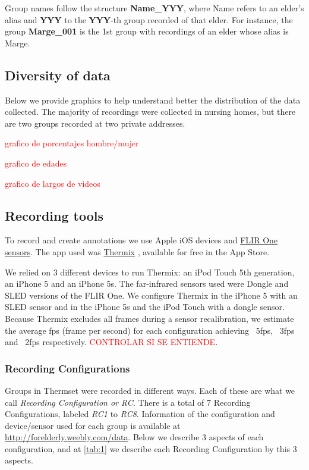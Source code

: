 \documentclass[oneside, twocolumn]{article}
\newcommand\myworries[1]{\textcolor{red}{#1}}
\begin{document}
Group names follow the structure \textbf{Name\_YYY}, where Name refers to an elder's alias and \textbf{YYY}
to the \textbf{YYY}-th group recorded of that elder. For instance, the group \textbf{Marge\_001} is the
1st group with recordings of an elder whose alias is Marge.

\subsection{Diversity of data}
Below we provide graphics to help understand better the distribution of the data collected. The majority of recordings were collected in nursing homes, but there are two groups recorded at two private addresses.

\myworries{grafico de porcentajes hombre/mujer}

\myworries{grafico de edades}

\myworries{grafico de largos de videos}

\subsection{Recording tools}
To record and create annotations we use Apple iOS devices and \href{http://www.flir.com/flirone/ios/}{FLIR One sensors}. The app used was \href{http://appstore.com/thermixforflirone}{Thermix}\cite{thermix} , available for free in the App Store.

We relied on 3 different devices to run Thermix: an iPod Touch 5th generation,
an iPhone 5 and an iPhone 5s. The far-infrared sensors used were Dongle and SLED versions of the FLIR One.
We configure Thermix in the iPhone 5 with an SLED sensor and in the iPhone 5s and the
iPod Touch with a dongle sensor\cite{sdk_flir_dongle}\cite{sdk_flir_sled}. Because Thermix excludes all frames during a sensor recalibration, we estimate the
average fps (frame per second) for each configuration achieving ~5fps, ~3fps and ~2fps respectively.
\myworries{CONTROLAR SI SE ENTIENDE}.

\subsubsection{Recording Configurations}
Groups in Thermset were recorded in different ways. Each of these are what we call \textit{Recording Configuration or RC}. There is a total of 7 Recording Configurations, labeled \textit{RC1} to \textit{RC8}. Information of the configuration and device/sensor used for each group is available at \url{http://forelderly.weebly.com/data}.  Below we describe 3 aspects of each configuration, and at \autoref{tab:1} we describe each Recording Configuration by this 3 aspects.
\end{document}
